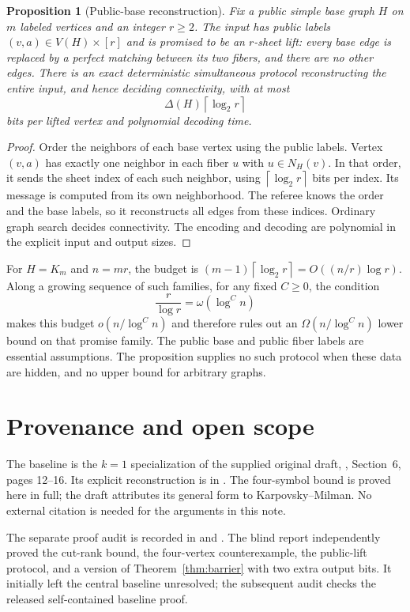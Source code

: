 \documentclass[11pt]{article}
\newtheorem{proposition}[theorem]{Proposition}
\theoremstyle{remark}
\newcommand{\ceil}[1]{\left\lceil #1\right\rceil}
\begin{document}
\begin{proposition}[Public-base reconstruction]\label{prop:lifts}
Fix a public simple base graph $H$ on $m$ labeled vertices and an integer
$r\ge2$. The input has public labels $(v,a)\in V(H)\times[r]$ and is
promised to be an $r$-sheet lift: every base edge is replaced by a
perfect matching between its two fibers, and there are no other edges.
There is an exact deterministic simultaneous protocol reconstructing
the entire input, and hence deciding connectivity, with at most
\[
 \Delta(H)\ceil{\log_2 r}
\]
bits per lifted vertex and polynomial decoding time.
\end{proposition}

\begin{proof}
Order the neighbors of each base vertex using the public labels.
Vertex $(v,a)$ has exactly one neighbor in each fiber $u$ with
$u\in N_H(v)$. In that order, it sends the sheet index of each such
neighbor, using $\ceil{\log_2 r}$ bits per index. Its message is
computed from its own neighborhood. The referee knows the order and
the base labels, so it reconstructs all edges from these indices.
Ordinary graph search decides connectivity. The encoding and decoding
are polynomial in the explicit input and output sizes.
\end{proof}

For $H=K_m$ and $n=mr$, the budget is
$(m-1)\ceil{\log_2 r}=O((n/r)\log r)$. Along a growing sequence of
such families, for any fixed $C\ge0$, the condition
\[
 \frac{r}{\log r}=\omega(\log^C n)
\]
makes this budget $o(n/\log^C n)$ and therefore rules out an
$\Omega(n/\log^C n)$ lower bound on that promise family.
The public base and public fiber labels are essential assumptions.
The proposition supplies no such protocol when these data are hidden,
and no upper bound for arbitrary graphs.

\clearpage
\section*{Provenance and open scope}

The baseline is the $k=1$ specialization of the supplied original draft,
, Section~6, pages 12--16.
Its explicit reconstruction is in
.
The four-symbol bound is proved here in full; the draft attributes its
general form to Karpovsky--Milman. No external citation is needed for
the arguments in this note.

The separate proof audit is recorded in
 and
.
The blind report independently proved the cut-rank bound, the
four-vertex counterexample, the public-lift protocol, and a version of
Theorem~\ref{thm:barrier} with two extra output bits. It initially left
the central baseline unresolved; the subsequent audit checks the
released self-contained baseline proof.
\end{document}
